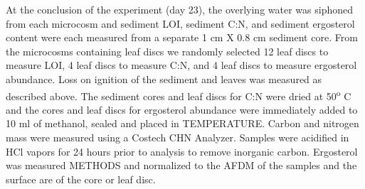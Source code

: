 At the conclusion of the experiment (day 23), the overlying water was siphoned from each microcosm and sediment LOI, sediment C:N, and sediment ergosterol content were each measured from a separate 1 cm X 0.8 cm sediment core.  From the microcosms containing leaf discs we randomly selected 12 leaf discs to measure LOI, 4 leaf discs to measure C:N, and 4 leaf discs to measure ergosterol abundance. Loss on ignition of the sediment and leaves was measured as described above. The sediment cores and leaf discs for C:N were dried at 50\textsuperscript{o} C and the cores and leaf discs for ergosterol abundance were immediately added to 10 ml of methanol, sealed and placed in TEMPERATURE. Carbon and nitrogen mass were measured using a Costech CHN Analyzer. Samples were acidified in HCl vapors for 24 hours prior to analysis to remove inorganic carbon.  Ergosterol was measured METHODS and normalized to the AFDM of the samples and the surface are of the core or leaf disc.  